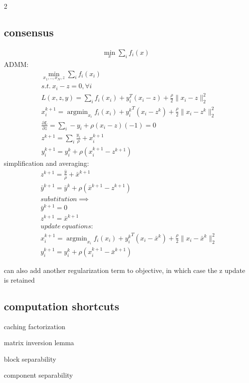 \documentclass[8pt]{extarticle}
\DeclareMathOperator*{\argmin}{argmin}
\newcommand{\norm}[1]{\|#1\|}
\begin{document}
\begin{multicols*}{2}
  \subsection{consensus}
  \begin{align*}
    \min_x \sum_i f_i(x)
  \end{align*}
  ADMM:
  \begin{align*}
    &\min_{x_1,..,x_N,z} \sum_i f_i(x_i)\\
    &s.t.\ x_i-z=0, \forall i\\
    &L(x,z,y) = \sum_i f_i(x_i)+y_i^T(x_i-z) + \frac{\rho}{2}\norm{x_i-z}_2^2\\
    &x_i^{k+1}=\argmin_{x_i} f_i(x_i)+{y_i^k}^T(x_i-z^k) + \frac{\rho}{2}\norm{x_i-z^k}_2^2\\
    &\frac{\partial L}{\partial z} = \sum_i -y_i + \rho (x_i-z)(-1)=0\\
    &z^{k+1} = \sum_i \frac{y_i}{\rho} + x_i^{k+1}\\
    &y_i^{k+1} = y_i^k + \rho(x_i^{k+1} - z^{k+1})
  \end{align*}
  simplification and averaging:
  \begin{align*}
    &z^{k+1} = \frac{\bar{y}}{\rho} + \bar{x}^{k+1}\\
    &\bar{y}^{k+1} = \bar{y}^k + \rho(\bar{x}^{k+1} - z^{k+1})\\
    &substitution \implies\\
    &\bar{y}^{k+1} = 0\\
    &z^{k+1} = \bar{x}^{k+1}\\
    &update\ equations:\\
    &x_i^{k+1}=\argmin_{x_i} f_i(x_i)+{y_i^k}^T(x_i-\bar{x}^k) + \frac{\rho}{2}\norm{x_i-\bar{x}^k}_2^2\\
    &y_i^{k+1} = y_i^k + \rho(x_i^{k+1} - \bar{x}^{k+1})
  \end{align*}  

  can also add another regularization term to objective, in which case the z update is retained
  
  \subsection{computation shortcuts}

  caching factorization

  matrix inversion lemma

  block separability

  component separability


\end{multicols*}
\end{document}
